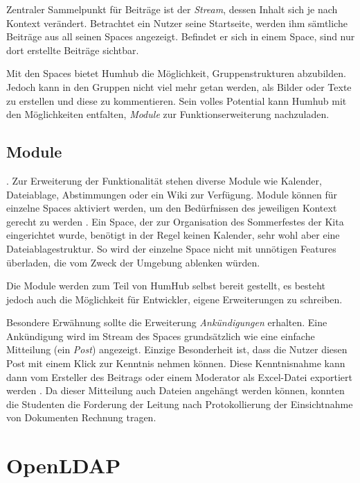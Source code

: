 Zentraler Sammelpunkt für Beiträge ist der \textit{Stream}, dessen Inhalt sich je nach Kontext verändert. Betrachtet ein Nutzer seine Startseite, werden ihm sämtliche Beiträge aus all seinen Spaces angezeigt. Befindet er sich in einem Space, sind nur dort erstellte Beiträge sichtbar.

Mit den Spaces bietet Humhub die Möglichkeit, Gruppenstrukturen abzubilden. Jedoch kann in den Gruppen nicht viel mehr getan werden, als Bilder oder Texte zu erstellen und diese zu kommentieren.
Sein volles Potential kann Humhub mit den Möglichkeiten entfalten, \textit{Module} zur Funktionserweiterung nachzuladen.

\subsection{Module}

 \citep[][]{modules}. Zur Erweiterung der Funktionalität stehen diverse Module wie Kalender, Dateiablage, Abstimmungen oder ein Wiki zur Verfügung.
Module können für einzelne Spaces aktiviert werden, um den Bedürfnissen des jeweiligen Kontext gerecht zu werden \citep[vgl.][ff.]{modules}. Ein Space, der zur Organisation des Sommerfestes der Kita eingerichtet wurde, benötigt \zb in der Regel keinen Kalender, sehr wohl aber eine Dateiablagestruktur.
So wird der einzelne Space nicht mit unnötigen Features überladen, die vom Zweck der Umgebung ablenken würden. 

Die Module werden zum Teil von HumHub selbst bereit gestellt, es besteht jedoch auch die Möglichkeit für Entwickler, eigene Erweiterungen zu schreiben.

Besondere Erwähnung sollte die Erweiterung \textit{Ankündigungen} erhalten. 
Eine Ankündigung wird im Stream des Spaces grundsätzlich wie eine einfache Mitteilung (ein \textit{Post}) angezeigt. Einzige Besonderheit ist, dass die Nutzer diesen Post mit einem Klick zur Kenntnis nehmen können. Diese Kenntnisnahme kann dann vom Ersteller des Beitrags oder einem Moderator \zb als Excel-Datei exportiert werden  \citep[Quellcode unter][]{announcement}. Da dieser Mitteilung auch Dateien angehängt werden können, konnten die Studenten die Forderung der Leitung nach Protokollierung der Einsichtnahme von Dokumenten Rechnung tragen.


\section{OpenLDAP}

